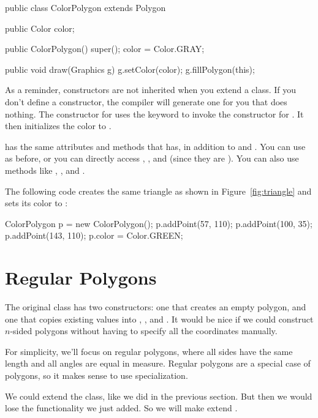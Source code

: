 \begin{code}
public class ColorPolygon extends Polygon {
    public Color color;

    public ColorPolygon() {
        super();
        color = Color.GRAY;
    }
    
    public void draw(Graphics g) {
        g.setColor(color);
        g.fillPolygon(this);
    }
}
\end{code}

As a reminder, constructors are not inherited when you extend a class.
If you don't define a constructor, the compiler will generate one for you that does nothing.
The constructor for  uses the  keyword to invoke the constructor for .
It then initializes the color to .

 has the same attributes and methods that  has, in addition to  and .
You can use  as before, or you can directly access , , and  (since they are ).
You can also use methods like , , and .

The following code creates the same triangle as shown in Figure~\ref{fig:triangle} and sets its color to :

\begin{code}
ColorPolygon p = new ColorPolygon();
p.addPoint(57, 110);
p.addPoint(100, 35);
p.addPoint(143, 110);
p.color = Color.GREEN;
\end{code}


\section{Regular Polygons}

The original  class has two constructors: one that creates an empty polygon, and one that copies existing values into , , and .
It would be nice if we could construct $n$-sided polygons without having to specify all the coordinates manually.

For simplicity, we'll focus on regular polygons, where all sides have the same length and all angles are equal in measure.
Regular polygons are a special case of polygons, so it makes sense to use specialization.

We could extend the  class, like we did in the previous section.
But then we would lose the  functionality we just added.
So we will make  extend .

